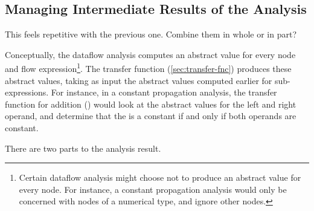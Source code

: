 \subsection{Managing Intermediate Results of the Analysis}
\label{sec:node-mapping}
\label{sec:store-management}

\begin{workinprogress}
This feels repetitive with the previous one.  Combine them in whole
  or in part?
\end{workinprogress}

Conceptually, the dataflow analysis computes an abstract value for every node and flow expression\footnote{Certain
dataflow analysis might choose not to produce an abstract value for every node.  For instance,
a constant propagation analysis would only be concerned with nodes of a numerical type, and
ignore other nodes.}.
The transfer function (\autoref{sec:transfer-fnc}) produces these abstract
values, taking as input the abstract values computed earlier for sub-expressions.
For instance, in a constant propagation analysis, the transfer function for
addition (\code{+}) would look at
the abstract values for the left and right operand, and determine that the 
is a constant if and only if both operands are constant.

There are two parts to the analysis result.

